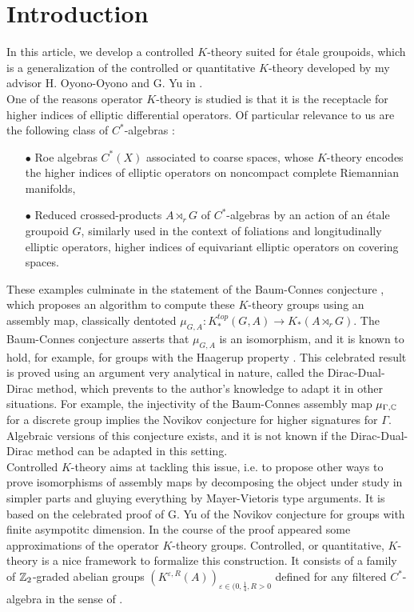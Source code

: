 \section{Introduction}

In this article, we develop a controlled $K$-theory suited for étale groupoids, which is a generalization of the controlled or quantitative $K$-theory developed by my advisor H. Oyono-Oyono and G. Yu in \cite{OY2}. \\

One of the reasons operator $K$-theory is studied is that it is the receptacle for higher indices of elliptic differential operators. Of particular relevance to us are the following class of $C^*$-algebras :\\
\begin{itemize}
\item[$\bullet$] Roe algebras $C^*(X)$ associated to coarse spaces, whose $K$-theory encodes the higher indices of elliptic operators on noncompact complete Riemannian manifolds, 
\item[$\bullet$] Reduced crossed-products $A\rtimes_r G$ of $C^*$-algebras by an action of an étale groupoid $G$, similarly used in the context of foliations and longitudinally elliptic operators, higher indices of equivariant elliptic operators on covering spaces.\\
\end{itemize}

These examples culminate in the statement of the Baum-Connes conjecture \cite{BaumConnesHigson}, which proposes an algorithm to compute these $K$-theory groups using an assembly map, classically dentoted $\mu_{G,A} : K^{top}_*(G,A)\rightarrow K_*(A\rtimes_r G)$. The Baum-Connes conjecture asserts that $\mu_{G,A}$ is an isomorphism, and it is known to hold, for example, for groups with the Haagerup property \cite{HigsonKasparov}. This celebrated result is proved using an argument very analytical in nature, called the Dirac-Dual-Dirac method, which prevents to the author's knowledge to adapt it in other situations. For example, the injectivity of the Baum-Connes assembly map $\mu_{\Gamma,\mathbb C}$ for a discrete group implies the Novikov conjecture for higher signatures for $\Gamma$. Algebraic versions of this conjecture exists, and it is not known if the Dirac-Dual-Dirac method can be adapted in this setting.  \\

Controlled $K$-theory aims at tackling this issue, i.e. to propose other ways to prove isomorphisms of assembly maps by decomposing the object under study in simpler parts and gluying everything by Mayer-Vietoris type arguments. It is based on the celebrated proof of G. Yu \cite{Yu1} of the Novikov conjecture for groups with finite asympotitc dimension. In the course of the proof appeared some approximations of the operator $K$-theory groups. Controlled, or quantitative, $K$-theory is a nice framework to formalize this construction. It consists of a family of $\mathbb Z_2$-graded abelian groups $(K^{\varepsilon, R}(A))_{\varepsilon\in(0,\frac{1}{4},R>0}$ defined for any filtered $C^*$-algebra in the sense of \cite{OY2}. \\


